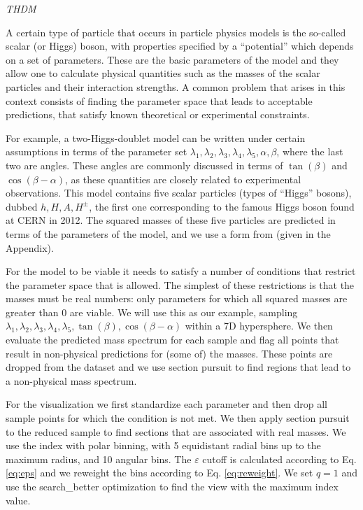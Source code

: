 \documentclass[]{interact}
\theoremstyle{plain}%
\theoremstyle{definition}
\theoremstyle{remark}
\begin{document}
\emph{THDM}

A certain type of particle that occurs in particle physics models is the
so-called scalar (or Higgs) boson, with properties specified by a
``potential'' which depends on a set of parameters. These are the basic
parameters of the model and they allow one to calculate physical
quantities such as the masses of the scalar particles and their
interaction strengths. A common problem that arises in this context
consists of finding the parameter space that leads to acceptable
predictions, that satisfy known theoretical or experimental constraints.

For example, a two-Higgs-doublet model can be written under certain
assumptions in terms of the parameter set
\(\lambda_1,\lambda_2,\lambda_3,\lambda_4,\lambda_5,\alpha,\beta\),
where the last two are angles. These angles are commonly discussed in
terms of \(\tan(\beta)\) and \(\cos(\beta-\alpha)\), as these quantities
are closely related to experimental observations. This model contains
five scalar particles (types of ``Higgs'' bosons), dubbed
\(h,H,A,H^\pm\), the first one corresponding to the famous Higgs boson
found at CERN in 2012. The squared masses of these five particles are
predicted in terms of the parameters of the model, and we use a form
from \citet{Gunion:2002zf} (given in the Appendix).

For the model to be viable it needs to satisfy a number of conditions
that restrict the parameter space that is allowed. The simplest of these
restrictions is that the masses must be real numbers: only parameters
for which all squared masses are greater than 0 are viable. We will use
this as our example, sampling
\(\lambda_1,\lambda_2,\lambda_3,\lambda_4,\lambda_5,\tan(\beta),\cos(\beta-\alpha)\)
within a 7D hypersphere. We then evaluate the predicted mass spectrum
for each sample and flag all points that result in non-physical
predictions for (some of) the masses. These points are dropped from the
dataset and we use section pursuit to find regions that lead to a
non-physical mass spectrum.

For the visualization we first standardize each parameter and then drop
all sample points for which the condition is not met. We then apply
section pursuit to the reduced sample to find sections that are
associated with real masses. We use the index with polar binning, with 5
equidistant radial bins up to the maximum radius, and 10 angular bins.
The \(\varepsilon\) cutoff is calculated according to Eq. \ref{eq:eps}
and we reweight the bins according to Eq. \ref{eq:reweight}. We set
\(q=1\) and use the search\_better optimization to find the view with
the maximum index value.
\end{document}
